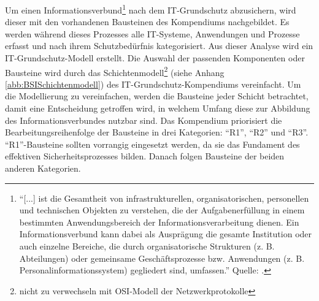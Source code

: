 Um einen Informationsverbund\footnote{\enquote{[...] ist die Gesamtheit von infrastrukturellen, organisatorischen, personellen und technischen Objekten zu verstehen, die der Aufgabenerfüllung in einem bestimmten Anwendungsbereich der Informationsverarbeitung dienen. Ein Informationsverbund kann dabei als Ausprägung die gesamte Institution oder	auch einzelne Bereiche, die durch organisatorische Strukturen (z. B. Abteilungen) oder gemeinsame Geschäftsprozesse bzw. Anwendungen (z. B. Personalinformationssystem) gegliedert sind, umfassen.} Quelle: \cite[][S.\,37]{bundesamt_fur_sicherheit_in_der_informationstechnik_bsi_it-grundschutz-kompendium_2020}.} nach dem IT-Grundschutz abzusichern, wird dieser mit den vorhandenen Bausteinen des Kompendiums nachgebildet. Es werden während dieses Prozesses alle IT-Systeme, Anwendungen und Prozesse erfasst und nach ihrem Schutzbedürfnis kategorisiert. Aus dieser Analyse wird ein IT-Grundschutz-Modell erstellt. Die Auswahl der passenden Komponenten oder Bausteine wird durch das Schichtenmodell\footnote{nicht zu verwechseln mit \ac{OSI}-Modell der Netzwerkprotokolle} (siehe Anhang \vref{abb:BSISchichtenmodell}) des IT-Grundschutz-Kompendiums vereinfacht. Um die Modellierung zu vereinfachen, werden die Bausteine jeder Schicht betrachtet, damit eine Entscheidung getroffen wird, in welchem Umfang diese zur Abbildung des Informationsverbundes nutzbar sind. Das Kompendium priorisiert die Bearbeitungsreihenfolge der Bausteine in drei Kategorien: \enquote{R1}, \enquote{R2} und \enquote{R3}. \enquote{R1}-Bausteine sollten vorrangig eingesetzt werden, da sie das Fundament des effektiven Sicherheitsprozesses bilden. Danach folgen Bausteine der beiden anderen Kategorien.


